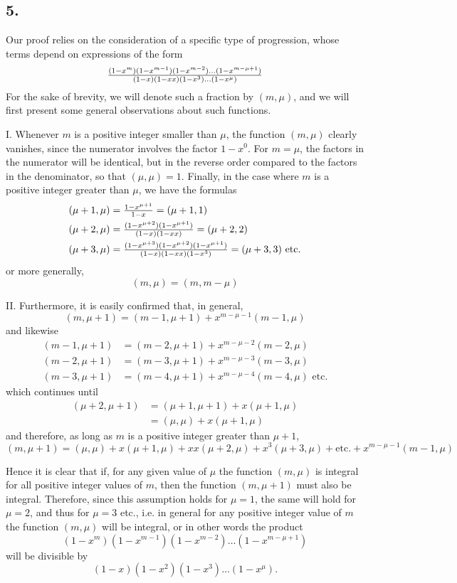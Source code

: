 \documentclass[twoside,12pt]{memoir}
\let\oldfrac\frac
\def\frac#1#2{\mathchoice{\tfrac{#1}{#2}}{\oldfrac{#1}{#2}}{\genfrac{}{}{}{2}{#1}{#2\mathstrut}}{\genfrac{}{}{}{3}{#1}{#2\mathstrut}}}
\begin{document}
\subsection*{5.}

Our proof relies on the consideration of a specific type of progression, whose terms depend on expressions of the form
\[\frac{(1-x^{m})(1-x^{m-1})(1-x^{m-2}) \ldots(1-x^{m-\mu+1})}{(1-x)(1-x x)(1-x^{3}) \ldots (1-x^{\mu})}\]
For the sake of brevity, we will denote such a fraction by \((m, \mu)\), and we will first present some general observations about such functions.

I. Whenever \(m\) is a positive integer smaller than \(\mu\), the function \((m, \mu)\) clearly vanishes, since the numerator involves the factor \(1-x^{0}\). For \(m = \mu\), the factors in the numerator will be identical, but in the reverse order compared to the factors in the denominator, so that \((\mu, \mu) = 1\). Finally, in the case where \(m\) is a positive integer greater than \(\mu\), we have the formulas
\[\begin{aligned}
& (\mu+1, \mu) = \frac{1-x^{\mu+1}}{1-x} = (\mu+1,1) \\
& (\mu+2, \mu) = \frac{(1-x^{\mu+2})(1-x^{\mu+1})}{(1-x)(1-x x)} = (\mu+2,2) \\
& (\mu+3, \mu) = \frac{(1-x^{\mu+3})(1-x^{\mu+2})(1-x^{\mu+1})}{(1-x)(1-xx)(1-x^{3})} = (\mu+3,3) \text{ etc{.}}
\end{aligned}\]\pagebreak%
or more generally,
\[(m, \mu) = (m, m-\mu)\]

II. Furthermore, it is easily confirmed that, in general,
\[(m, \mu+1)=(m-1, \mu+1)+x^{m-\mu-1}(m-1, \mu)\]
and likewise
\[\begin{aligned}
(m-1, \mu+1)&=(m-2, \mu+1)+x^{m-\mu-2}(m-2, \mu) \\
(m-2, \mu+1)&=(m-3, \mu+1)+x^{m-\mu-3}(m-3, \mu) \\
(m-3, \mu+1)&=(m-4, \mu+1)+x^{m-\mu-4}(m-4, \mu) \text{ etc{.}}
\end{aligned}\]
which continues until
\[\begin{aligned}
(\mu+2, \mu+1) & =(\mu+1, \mu+1)+x(\mu+1, \mu) \\
& =(\mu, \mu)+x(\mu+1, \mu)
\end{aligned}\]
and therefore, as long as \(m\) is a positive integer greater than \(\mu+1\), 
\[(m, \mu+1)=(\mu, \mu) +x(\mu+1, \mu)+x x(\mu+2, \mu)+x^{3}(\mu+3, \mu)+\text{etc{.}} +x^{m-\mu-1}(m-1, \mu)\]

Hence it is clear that if, for any given value of \(\mu\) the function \((m, \mu)\) is integral for all positive integer values of \(m\), then the function \((m, \mu+1)\) must also be integral. Therefore, since this assumption holds for \(\mu=1\), the same will hold for \(\mu=2\), and thus for \(\mu=3\) etc{.}, i{.}e{.} in general for any positive integer value of \(m\) the function \((m, \mu)\) will be integral, or in other words the product
\[(1-x^{m})(1-x^{m-1})(1-x^{m-2}) \ldots(1-x^{m-\mu+1})\]
will be divisible by
\[(1-x)(1-x^{2})(1-x^{3}) \ldots(1-x^{\mu}).\]
\end{document}
